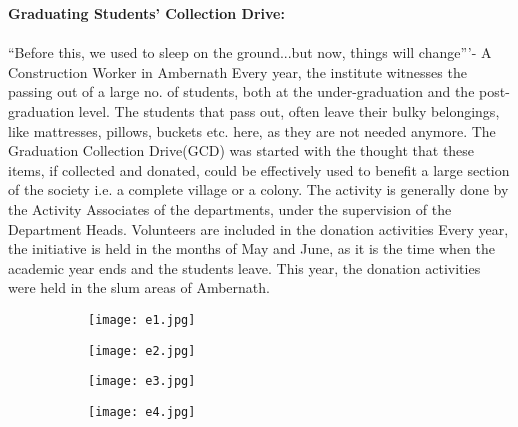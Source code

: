 \noindent \textbf {\Large Graduating Students' Collection Drive:}\\ \\“Before this, we used to sleep on the ground...but now, things will change”’- A Construction Worker in Ambernath
\linebreak
Every year, the institute witnesses the passing out of a large no. of students, both at the under-graduation and the post-graduation level. The students that pass out, often leave their bulky belongings, like mattresses, pillows, buckets etc. here, as they are not needed anymore. The Graduation Collection Drive(GCD) was started with the thought that these items, if collected and donated, could be effectively used to benefit a large section of the society i.e. a complete village or a colony. The activity is generally done by the Activity Associates of the departments, under the supervision of the Department Heads. Volunteers are included in the donation activities Every year, the initiative is held in the months of May and June, as it is the time when the academic year ends and the students leave. This year, the donation activities were held in the slum areas of Ambernath.

\begin{figure}[H]
\centering
\begin{subfigure}{.5\textwidth}
 \centering
 \texttt{[image: e1.jpg]}
\end{subfigure}%
\begin{subfigure}{.5\textwidth}
\texttt{[image: e2.jpg]}
\end{subfigure}
\end{figure}

\begin{figure}[H]
\centering
\begin{subfigure}{.5\textwidth}
 \centering
 \texttt{[image: e3.jpg]}
\end{subfigure}%
\begin{subfigure}{.5\textwidth}
\texttt{[image: e4.jpg]}
\end{subfigure}
\end{figure}

